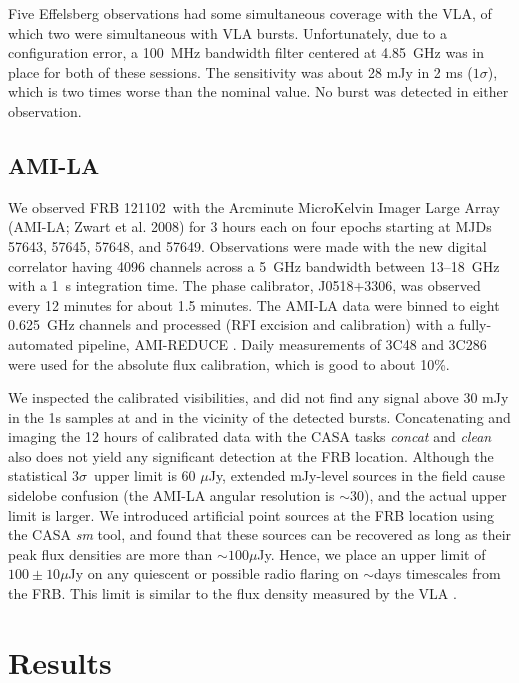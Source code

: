\documentclass[twocolumn]{aastex61}
\newcommand{\frb}{FRB 121102}
\begin{document}
Five Effelsberg observations had some simultaneous coverage with the VLA, of which two were simultaneous with VLA bursts. Unfortunately, due to a configuration error, a 100~MHz bandwidth filter centered at 4.85~GHz was in place for both of these sessions. The sensitivity was about 28 mJy in 2 ms ($1\sigma$), which is two times worse than the nominal value. No burst was detected in either observation.

\subsection{AMI-LA}

We observed \frb\ with the Arcminute MicroKelvin Imager Large Array (AMI-LA; Zwart et al. 2008) for 3 hours each on four epochs starting at MJDs 57643, 57645, 57648, and 57649. Observations were made with the new digital correlator having 4096 channels across a 5~GHz bandwidth between 13--18~GHz with a 1~s integration time. The phase calibrator, J0518+3306, was observed every 12 minutes for about 1.5 minutes. The AMI-LA data were binned to eight 0.625~GHz channels and processed (RFI excision and calibration) with a fully-automated pipeline, AMI-REDUCE \citep[e.g.,][]{2013MNRAS.429.3330P}. Daily measurements of 3C48 and 3C286 were used for the absolute flux calibration, which is good to about 10\%. 

We inspected the calibrated visibilities, and did not find any signal above 30 mJy in the 1s samples at and in the vicinity of the detected bursts. Concatenating and imaging the 12 hours of calibrated data with the CASA tasks {\it concat} and {\it clean} also does not yield any significant detection at the FRB location. Although the statistical $3\sigma$\ upper limit is 60 $\mu$Jy, extended mJy-level sources in the field cause sidelobe confusion (the AMI-LA angular resolution is $\sim$30\arcsec), and the actual upper limit is larger. We introduced artificial point sources at the FRB location using the CASA {\it sm} tool, and found that these sources can be recovered as long as their peak flux densities are more than $\sim100\mu$Jy. Hence, we place an upper limit of $100\pm10 \mu$Jy on any quiescent or possible radio flaring on $\sim$days timescales from the FRB. This limit is similar to the flux density measured by the VLA \citep{LOC}.

\section{Results}
\end{document}

